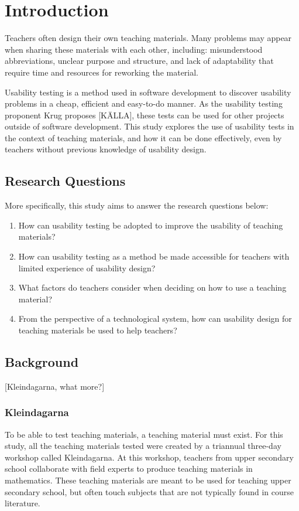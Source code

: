 \chapter{Introduction}

Teachers often design their own teaching materials. Many problems may appear when sharing these materials with each other, including: misunderstood abbreviations, unclear purpose and structure, and lack of adaptability that require time and resources for reworking the material.

Usability testing is a method used in software development to discover usability problems in a cheap, efficient and easy-to-do manner. As the usability testing proponent Krug proposes [KÄLLA], these tests can be used for other projects outside of software development. This study explores the use of usability tests in the context of teaching materials, and how it can be done effectively, even by teachers without previous knowledge of usability design.

\section{Research Questions}
More specifically, this study aims to answer the research questions below:

\begin{enumerate}
	\item How can usability testing be adopted to improve the usability of teaching materials?
	\item How can usability testing as a method be made accessible for teachers with limited experience of usability design?
	\item What factors do teachers consider when deciding on how to use a teaching material?
	\item From the perspective of a technological system, how can usability design for teaching materials be used to help teachers?
\end{enumerate}

\section{Background}
[Kleindagarna, what more?]

\subsection{Kleindagarna}
To be able to test teaching materials, a teaching material must exist. For this study, all the teaching materials tested were created by a triannual three-day workshop called Kleindagarna. At this workshop, teachers from upper secondary school collaborate with field experts to produce teaching materials in mathematics. These teaching materials are meant to be used for teaching upper secondary school, but often touch subjects that are not typically found in course literature.
